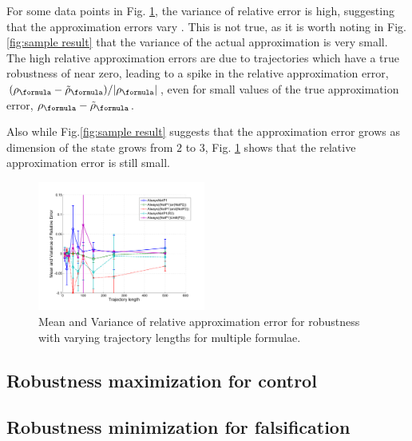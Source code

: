 For some data points in Fig. \ref{fig:relative error}, the variance of relative error is high, suggesting that the approximation errors vary . This is not true, as it is worth noting in Fig. \ref{fig:sample result} that the variance of the actual approximation is very small. The high relative approximation errors are due to trajectories which have a true robustness of near zero, leading to a spike in the relative approximation error, $(\robf-\srobf)/|\robf|$, even for small values of the true approximation error, $\robf-\srobf$.

Also while Fig.\ref{fig:sample result} suggests that the approximation error grows as dimension of the state grows from $2$ to $3$, Fig. \ref{fig:relative error} shows that the relative approximation error is still small. 

\begin{figure}[t]
\centering
\includegraphics[width=0.49\textwidth]{figures/RobustnessErrorRel}
\caption{Mean and Variance of relative approximation error for robustness with varying trajectory lengths for multiple formulae.}
\label{fig:relative error}
\end{figure}


\subsection{Robustness maximization for control}
\label{sec:toy example}


\subsection{Robustness minimization for falsification}
\label{sec:toy falsification}
